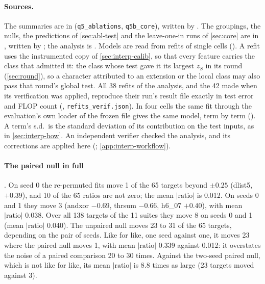 \paragraph{Sources.} The summaries are in  (\texttt{q5\_ablations}, \texttt{q5b\_core}), written by . The groupings, the nulls, the predictions of \cref{sec:abl-test} and the leave-one-in runs of \cref{sec:core} are in , written by ; the analysis is . Models are read from refits of single cells (). A refit uses the instrumented copy of \cref{sec:interp-calib}, so that every feature carries the class that admitted it: the class whose test gave it its largest $z_S$ in its round (\cref{sec:round}), so a character attributed to an extension or the local class may also pass that round's global test. All 38 refits of the analysis, and the 42 made when its verification was applied, reproduce their run's result file exactly in test error and FLOP count (, \texttt{refits\_verif.json}). In four cells the same fit through the evaluation's own loader of the frozen file gives the same model, term by term (). A term's s.d.\ is the standard deviation of its contribution on the test inputs, as in \cref{sec:interp-how}. An independent verifier checked the analysis, and its corrections are applied here (; \cref{app:interp-workflow}).

\paragraph{The paired null in full} . On seed 0 the re-permuted fits move 1 of the 65 targets beyond $\pm0.25$ (dlist5, $+0.39$), and 10 of the 65 ratios are not zero; the mean $|\text{ratio}|$ is 0.012. On seeds 0 and 1 they move 3 (andxor $-0.69$, thrsum $-0.66$, h6\_07 $+0.40$), with mean $|\text{ratio}|$ 0.038. Over all 138 targets of the 11 suites they move 8 on seeds 0 and 1 (mean $|\text{ratio}|$ 0.040). The unpaired null moves 23 to 31 of the 65 targets, depending on the pair of seeds. Like for like, one seed against one, it moves 23 where the paired null moves 1, with mean $|\text{ratio}|$ 0.339 against 0.012: it overstates the noise of a paired comparison 20 to 30 times. Against the two-seed paired null, which is not like for like, its mean $|\text{ratio}|$ is 8.8 times as large (23 targets moved against 3).

